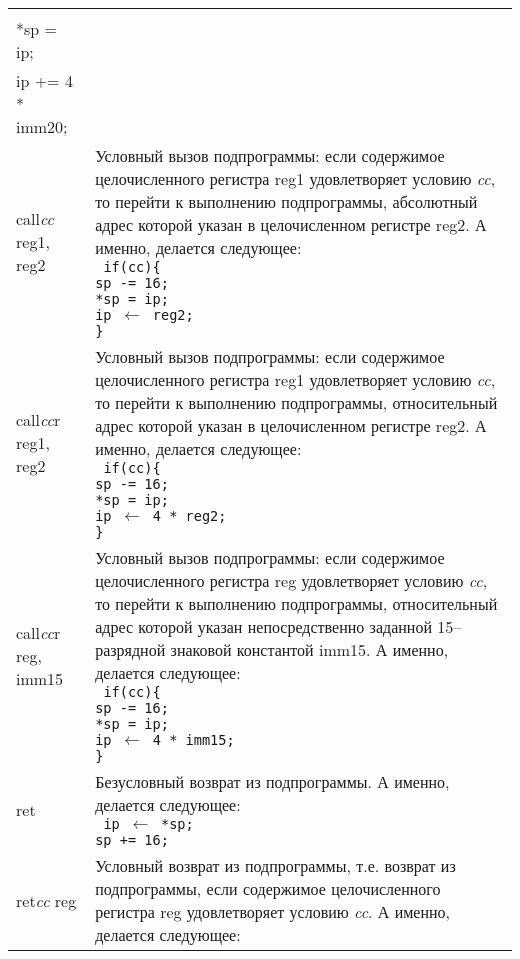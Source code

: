 \documentclass[10pt]{report}
\begin{document}
\begin{longtable}[c]{|l|p{12.5cm}|}
{{\texttt{%
\phantom{aaaa}sp -= 16;\\
\phantom{aaaa}*sp = ip;\\
\phantom{aaaa}ip += 4 * imm20;
}
}} \\ \hline
call\textit{cc} reg1, reg2    & {\parbox{12.4cm}{Условный вызов подпрограммы: если содержимое целочисленного регистра reg1 удовлетворяет условию \textit{cc}, то перейти к выполнению подпрограммы, абсолютный адрес которой указан в целочисленном регистре reg2. А именно, делается следующее:\\ %
\texttt{%
if(cc)\{\\
\phantom{aaaa}sp -= 16;\\
\phantom{aaaa}*sp = ip;\\
\phantom{aaaa}ip $\leftarrow$ reg2;\\
\}
}
}} \\ \hline
call\textit{cc}r reg1, reg2   & {\parbox{12.4cm}{Условный вызов подпрограммы: если содержимое целочисленного регистра reg1 удовлетворяет условию \textit{cc}, то перейти к выполнению подпрограммы, относительный адрес которой указан в целочисленном регистре reg2. А именно, делается следующее:\\ %
\texttt{%
if(cc)\{\\
\phantom{aaaa}sp -= 16;\\
\phantom{aaaa}*sp = ip;\\
\phantom{aaaa}ip $\leftarrow$ 4 * reg2;\\
\}
}
}} \\ \hline
call\textit{cc}r reg, imm15   & {\parbox{12.4cm}{Условный вызов подпрограммы: если содержимое целочисленного регистра reg удовлетворяет условию \textit{cc}, то перейти к выполнению подпрограммы, относительный адрес которой указан непосредственно заданной 15--разрядной знаковой константой imm15. А именно, делается следующее:\\ %
\texttt{%
if(cc)\{\\
\phantom{aaaa}sp -= 16;\\
\phantom{aaaa}*sp = ip;\\
\phantom{aaaa}ip $\leftarrow$ 4 * imm15;\\
\}
}
}} \\ \hline
ret                           & {\parbox{12.4cm}{Безусловный возврат из подпрограммы. А именно, делается следующее:\\ %
\texttt{%
\phantom{aaaa}ip $\leftarrow$ *sp;\\
\phantom{aaaa}sp += 16;
}
}} \\ \hline
ret\textit{cc} reg            & {\parbox{12.4cm}{Условный возврат из подпрограммы, т.е. возврат из подпрограммы, если содержимое целочисленного регистра reg удовлетворяет условию \textit{cc}. А именно, делается следующее:\\ %
}}
\end{longtable}
\end{document}

